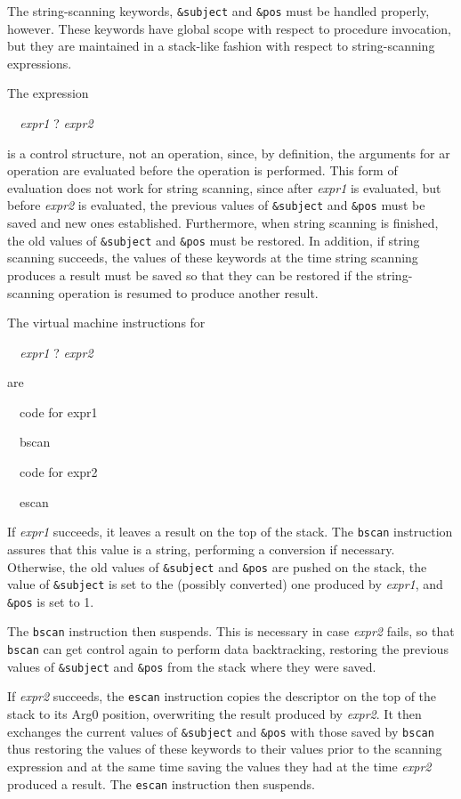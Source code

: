 The string-scanning keywords, \texttt{\&subject} and \texttt{\&pos}
must be handled properly, however. These keywords have global scope
with respect to procedure invocation, but they are maintained in a
stack-like fashion with respect to string-scanning expressions.

The expression

{\ttfamily\mdseries
\textit{\ \ expr1 }? \textit{expr2}}

\noindent is a control structure, not an operation, since, by
definition, the arguments for ar operation are evaluated before the
operation is performed. This form of evaluation does not work for
string scanning, since after \textit{expr1} is evaluated, but before
\textit{expr2} is evaluated, the previous values of \texttt{\&subject}
and \texttt{\&pos} must be saved and new ones
established. Furthermore, when string scanning is finished, the old
values of \texttt{\&subject} and \texttt{\&pos} must be restored. In
addition, if string scanning succeeds, the values of these keywords at
the time string scanning produces a result must be saved so that they
can be restored if the string-scanning operation is resumed to produce
another result.

The virtual machine instructions for

{\ttfamily\mdseries
\textit{\ \ expr1 }? \textit{expr2}}

are

{\ttfamily\mdseries
\ \ code for expr1}

{\ttfamily\mdseries
\ \ bscan}

{\ttfamily\mdseries
\ \ code for expr2}

{\ttfamily\mdseries
\ \ escan}

If \textit{expr1} succeeds, it leaves a result on the top of the
stack. The \texttt{bscan} instruction assures that this value is a
string, performing a conversion if necessary. Otherwise, the old
values of \texttt{\&subject} and \texttt{\&pos} are pushed on the
stack, the value of \texttt{\&subject} is set to the (possibly
converted) one produced by \textit{expr1}, and \texttt{\&pos} is set
to 1.


The \texttt{bscan} instruction then suspends. This is necessary in
case \textit{expr2} fails, so that \texttt{bscan} can get control
again to perform data backtracking, restoring the previous values of
\texttt{\&subject} and \texttt{\&pos} from the stack where they were
saved.


If \textit{expr2} succeeds, the \texttt{escan} instruction copies the
descriptor on the top of the stack to its Arg0 position, overwriting
the result produced by \textit{expr2}. It then exchanges the current
values of \texttt{\&subject} and \texttt{\&pos} with those saved by
\texttt{bscan} thus restoring the values of these keywords to their
values prior to the scanning expression and at the same time saving
the values they had at the time \textit{expr2} produced a result. The
\texttt{escan} instruction then suspends.

